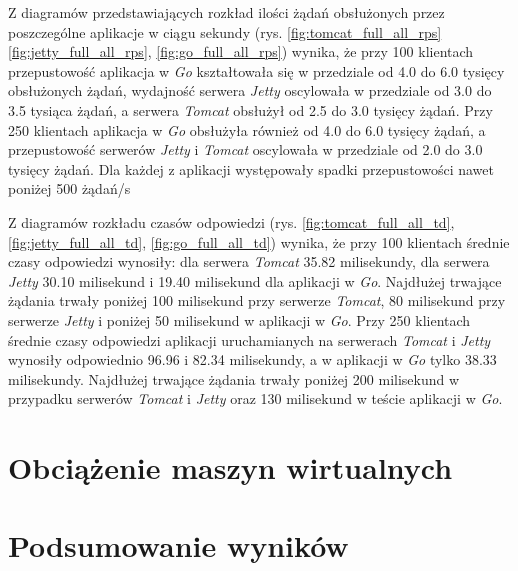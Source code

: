 Z diagramów przedstawiających rozkład ilości żądań obsłużonych przez poszczególne aplikacje w ciągu sekundy  (rys. \ref{fig:tomcat_full_all_rps} \ref{fig:jetty_full_all_rps}, \ref{fig:go_full_all_rps}) wynika, że przy 100 klientach przepustowość aplikacja w \textsl{Go} kształtowała się w przedziale od 4.0 do 6.0 tysięcy obsłużonych żądań, wydajność serwera \textsl{Jetty} oscylowała w przedziale od 3.0 do 3.5 tysiąca  żądań, a  serwera \textsl{Tomcat}  obsłużył od 2.5 do 3.0 tysięcy żądań. Przy 250 klientach aplikacja w \textsl{Go} obsłużyła również od 4.0 do 6.0 tysięcy żądań, a przepustowość serwerów \textsl{Jetty} i \textsl{Tomcat} oscylowała w przedziale od 2.0 do 3.0 tysięcy żądań. Dla każdej z aplikacji występowały spadki przepustowości nawet poniżej 500 żądań/s

Z diagramów rozkładu czasów odpowiedzi (rys. \ref{fig:tomcat_full_all_td}, \ref{fig:jetty_full_all_td}, \ref{fig:go_full_all_td}) wynika, że przy 100 klientach średnie czasy odpowiedzi wynosiły: dla serwera \textsl{Tomcat} 35.82 milisekundy, dla serwera \textsl{Jetty} 30.10 milisekund i 19.40 milisekund dla aplikacji w \textsl{Go}. Najdłużej trwające żądania trwały poniżej 100 milisekund przy serwerze \textsl{Tomcat}, 80 milisekund przy serwerze \textsl{Jetty} i  poniżej 50 milisekund  w aplikacji w \textsl{Go}. Przy 250 klientach średnie czasy odpowiedzi aplikacji uruchamianych na serwerach \textsl{Tomcat}  i \textsl{Jetty}   wynosiły odpowiednio 96.96 i 82.34 milisekundy, a w aplikacji w \textsl{Go} tylko 38.33 milisekundy. Najdłużej trwające żądania trwały poniżej 200 milisekund w przypadku serwerów \textsl{Tomcat} i \textsl{Jetty} oraz 130 milisekund w teście aplikacji w \textsl{Go}.


\clearpage

\section{Obciążenie maszyn wirtualnych}

\newpage
\section{Podsumowanie wyników}
